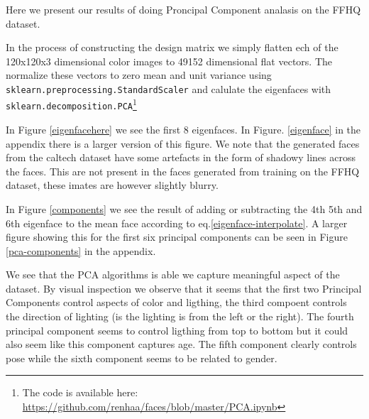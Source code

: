 Here we present our results of doing Proncipal Component analasis on the FFHQ dataset. 

In the process of constructing the design matrix we simply flatten ech of the 120x120x3 dimensional color images to 49152 dimensional flat vectors. The normalize these vectors to zero mean and unit variance using\\ {\tt sklearn.preprocessing.StandardScaler} and calulate the eigenfaces with {\tt sklearn.decomposition.PCA}\footnote{The code is available here: \url{https://github.com/renhaa/faces/blob/master/PCA.ipynb}}

In Figure \ref{eigenfacehere} we see the first 8 eigenfaces. In Figure. \ref{eigenface} in the appendix there is a larger version of this figure. We note that the generated faces from the caltech dataset have some artefacts in the form of shadowy lines across the faces. This are not present in the faces generated from training on the FFHQ dataset, these imates are however slightly blurry.   

In Figure \ref{components} we see the result of adding or subtracting the 4th 5th and 6th eigenface to the mean face according to eq.\ref{eigenface-interpolate}. A larger figure showing this for the first six principal components can be seen in Figure \ref{pca-components} in the appendix. 

We see that the PCA algorithms is able we capture meaningful aspect of the dataset.
By visual inspection we observe that it seems that the first two Principal Components control aspects of color and ligthing, the third compoent controls the direction of lighting (is the lighting is from the left or the right). The fourth principal component seems to control ligthing from top to bottom but it could also seem like this component captures age. The fifth component clearly controls pose while the sixth component seems to be related to gender.

